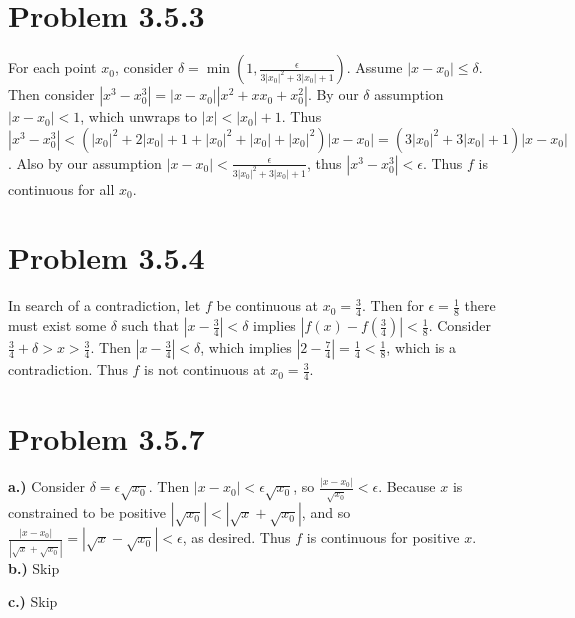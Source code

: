 \documentclass[10pt]{article} %
\begin{document}
  
\section{Problem 3.5.3}
For each point $x_0$, consider $\delta = \min\left(1,\frac{\epsilon}{3|x_0|^2+3|x_0|+1}\right)$. Assume $|x - x_0| \leq \delta$. Then consider $|x^3-x_0^3| = |x-x_0||x^2+xx_0+x_0^2|$. By our $\delta$ assumption $|x-x_0| < 1$, which unwraps to $|x| < |x_0|+1$. Thus $|x^3-x_0^3| < \left(|x_0|^2 + 2|x_0| + 1 + |x_0|^2 + |x_0| + |x_0|^2\right)|x-x_0| = \left(3|x_0|^2 + 3|x_0| + 1\right)|x-x_0|$. Also by our assumption $|x-x_0| < \frac{\epsilon}{3|x_0|^2+3|x_0|+1}$, thus $|x^3-x_0^3| < \epsilon$. Thus $f$ is continuous for all $x_0$.\\

\section{Problem 3.5.4}
In search of a contradiction, let $f$ be continuous at $x_0 = \frac{3}{4}$. Then for $\epsilon = \frac{1}{8}$ there must exist some $\delta$ such that $|x - \frac{3}{4}| < \delta$ implies $|f(x)-f(\frac{3}{4})| < \frac{1}{8}$. Consider $\frac{3}{4} + \delta > x > \frac{3}{4}$. Then $|x-\frac{3}{4}|<\delta$, which implies $|2-\frac{7}{4}| = \frac{1}{4} < \frac{1}{8}$, which is a contradiction. Thus $f$ is not continuous at $x_0 = \frac{3}{4}$.\\

\section{Problem 3.5.7}
\textbf{a.)} Consider $\delta = \epsilon\sqrt{x_0}$. Then $|x-x_0| < \epsilon\sqrt{x_0}$, so $\frac{|x-x_0|}{\sqrt{x_0}} < \epsilon$. Because $x$ is constrained to be positive $|\sqrt{x_0}| < |\sqrt{x} + \sqrt{x_0}|$, and so $\frac{|x-x_0|}{|\sqrt{x}+\sqrt{x_0}|} = |\sqrt{x}-\sqrt{x_0}| < \epsilon$, as desired. Thus $f$ is continuous for positive $x$.\\
\textbf{b.)} Skip

\textbf{c.)} Skip
\end{document}
